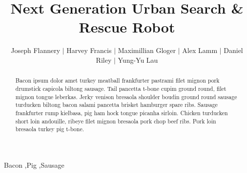 \documentclass[final,12pt]{elsarticle}
\begin{document}
\begin{frontmatter}


\title{Next Generation Urban Search \& Rescue Robot}




\author{Joseph Flannery $\vert$ Harvey Francis $\vert$ Maximillian Gloger $\vert$ Alex Lamm $\vert$ Daniel Riley $\vert$ Yung-Yu Lau}

\address{University of Warwick}

\begin{abstract}
Bacon ipsum dolor amet turkey meatball frankfurter pastrami filet mignon pork drumstick capicola biltong sausage. Tail pancetta t-bone cupim ground round, filet mignon tongue leberkas. Jerky venison bresaola shoulder boudin ground round sausage turducken biltong bacon salami pancetta brisket hamburger spare ribs. Sausage frankfurter rump kielbasa, pig ham hock tongue picanha sirloin. Chicken turducken short loin andouille, ribeye filet mignon bresaola pork chop beef ribs. Pork loin bresaola turkey pig t-bone.
\end{abstract}
\begin{keyword}
Bacon \sep Pig \sep Sausage


\end{keyword}

\end{frontmatter}
\end{document}
